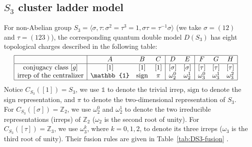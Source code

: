 \documentclass[a4paper,11pt]{article}
\theoremstyle{theorem}
\theoremstyle{remark}
\begin{document}
\subsection{$S_3$ cluster ladder model}

For non-Abelian group $S_3= \langle \sigma, \tau: \sigma^2=\tau^3=1, \sigma \tau = \tau^{-1}\sigma \rangle $ (we take $\sigma=(12)$ and $\tau=(123)$), the corresponding quantum double model $D(S_3)$ has eight topological charges described in the following table:
\begin{align*}
\begin{array}{|c|ccc|cc|ccc|}
\hline
      & A & B & C & D & E  & F & G & H   \\
\hline
\text{conjugacy class} ~[g] &  [1] &  [1] &  [1] &  [\sigma]  & [\sigma] &  [\tau] &  [\tau]  &  [\tau]    \\
 \text{irrep of the centralizer}     & \mathbb{1} & \mathrm{sign} & \pi & \omega_2^0 & \omega_2^1 &  \omega_3^0 & \omega_3^1 & \omega_3^2 \\
\hline
\end{array}
\end{align*}
Notice $C_{S_3}([1])=S_3$, we use $\mathbb{1}$ to denote the trivial irrep, $\mathrm{sign}$ to denote the sign representation, and $\pi$ to denote the two-dimensional representation of $S_3$.
For \( C_{S_3}([\sigma]) = \mathbb{Z}_2 \), we use \(\omega_2^0\) and \(\omega_2^1\) to denote the two irreducible representations (irreps) of \(\mathbb{Z}_2\) (\(\omega_2\) is the second root of unity).  
For \( C_{S_3}([\tau]) = \mathbb{Z}_3 \), we use \(\omega_3^k\), where \(k = 0, 1, 2\), to denote its three irreps (\(\omega_3\) is the third root of unity). Their fusion rules are given in Table~\ref{tab:DS3-fusion}  \cite{Beigi2011the,Cui2015universal}.
\end{document}
